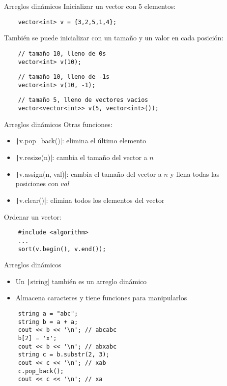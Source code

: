 \documentclass[10pt]{beamer}
\newcommand{\bi}{\begin{itemize}}
\newcommand{\ei}{\end{itemize}}
\begin{document}
\begin{frame}[fragile]{Arreglos dinámicos}
  Inicializar un vector con 5 elementos:
  \begin{verbatim}
    vector<int> v = {3,2,5,1,4};
  \end{verbatim}
  También se puede inicializar con un tamaño y un valor en cada posición:
  \begin{verbatim}
    // tamaño 10, lleno de 0s
    vector<int> v(10); 
  \end{verbatim}
  \begin{verbatim}
    // tamaño 10, lleno de -1s
    vector<int> v(10, -1); 
  \end{verbatim}
  \begin{verbatim}
    // tamaño 5, lleno de vectores vacios
    vector<vector<int>> v(5, vector<int>()); 
  \end{verbatim}
\end{frame}

\begin{frame}[fragile]{Arreglos dinámicos}
  Otras funciones:
  \bi
    \item \texttt|v.pop_back()|: elimina el último elemento
    \item \texttt|v.resize(n)|: cambia el tamaño del vector a $n$
    \item \texttt|v.assign(n, val)|: cambia el tamaño del vector a $n$ y llena todas las posiciones con $val$
    \item \texttt|v.clear()|: elimina todos los elementos del vector
  \ei
  Ordenar un vector:
  \begin{verbatim}
    #include <algorithm>
    ...
    sort(v.begin(), v.end());
  \end{verbatim}
\end{frame}

\begin{frame}[fragile]{Arreglos dinámicos}
  \bi
  \item Un \texttt|string| también es un arreglo dinámico
  \item Almacena caracteres y tiene funciones para manipularlos
  \ei
  \begin{verbatim}
    string a = "abc";
    string b = a + a;
    cout << b << '\n'; // abcabc
    b[2] = 'x';
    cout << b << '\n'; // abxabc
    string c = b.substr(2, 3);
    cout << c << '\n'; // xab
    c.pop_back();
    cout << c << '\n'; // xa
  \end{verbatim}
\end{frame}
\end{document}
